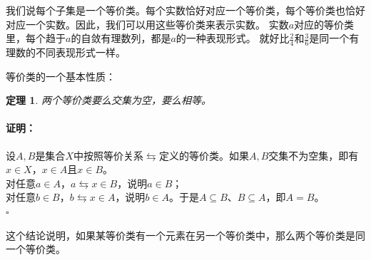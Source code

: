 \documentclass[12pt,UTF8]{ctexbook}
\newtheorem{tm}{定理}[section]
\renewenvironment{proof}{\paragraph{\textbf{证明：}}}{\hfill$\square$}
\begin{document}
\begin{appendix}
我们说每个子集是一个等价类。每个实数恰好对应一个等价类，每个等价类也恰好对应一个实数。因此，我们可以用这些等价类来表示实数。
实数$a$对应的等价类里，每个趋于$a$的自敛有理数列，都是$a$的一种表现形式。
就好比$\frac{2}{4}$和$\frac{3}{6}$是同一个有理数的不同表现形式一样。

等价类的一个基本性质：
\begin{tm}\label{lm:a-1-10}
    两个等价类要么交集为空，要么相等。    
\end{tm}
\begin{proof}
    设$A,B$是集合$X$中按照等价关系$\leftrightarrows$定义的等价类。如果$A,B$交集不为空集，即有$x\in X$，$x\in A$且$x\in B$。\\
    对任意$a\in A$，$a\leftrightarrows x\in B$，说明$a\in B$；\\
    对任意$b\in B$，$b\leftrightarrows x\in A$，说明$b\in A$。于是$A\subseteq B$、$B\subseteq A$，即$A = B$。\\
\end{proof}

这个结论说明，如果某等价类有一个元素在另一个等价类中，那么两个等价类是同一个等价类。


\end{appendix}
\end{document}
